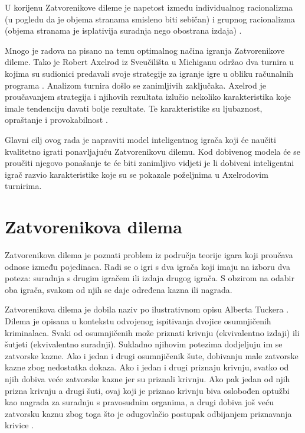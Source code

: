 \documentclass[zavrsnirad]{fer}
\begin{document}
	U korijenu Zatvorenikove dileme je napetost između individualnog racionalizma (u pogledu da je objema stranama smisleno biti sebičan) i grupnog racionalizma (objema stranama je isplativija suradnja nego obostrana izdaja) \cite{1980Axelrod1}.
	
	Mnogo je radova na pisano na temu optimalnog načina igranja Zatvorenikove dileme. Tako je Robert Axelrod iz Sveučilišta u Michiganu održao dva turnira u kojima su sudionici predavali svoje strategije za igranje igre u obliku računalnih programa \cite{1980Axelrod1} \cite{1980Axelrod2}. Analizom turnira došlo se zanimljivih zaključaka. Axelrod je proučavanjem strategija i njihovih rezultata izlučio nekoliko karakteristika koje imale tendenciju davati bolje rezultate. Te karakteristike su ljubaznost, opraštanje i provokabilnost \cite{1980Axelrod2}.
	
	Glavni cilj ovog rada je napraviti model inteligentnog igrača koji će naučiti kvalitetno igrati ponavljajuću Zatvorenikovu dilemu. Kod dobivenog modela će se proučiti njegovo ponašanje te će biti zanimljivo vidjeti je li dobiveni inteligentni igrač razvio karakteristike koje su se pokazale poželjnima u Axelrodovim turnirima.
	

\chapter{Zatvorenikova dilema}
\label{pog:ZatvorenikovaDilema}

	Zatvorenikova dilema je poznati problem iz područja teorije igara koji proučava odnose između pojedinaca. Radi se o igri s dva igrača koji imaju na izboru dva poteza: suradnja s drugim igračem ili izdaja drugog igrača. S obzirom na odabir oba igrača, svakom od njih se daje određena kazna ili nagrada. 
	
	Zatvorenikova dilema je dobila naziv po ilustrativnom opisu Alberta Tuckera \cite{TeorijaIgaraIPravo}. Dilema je opisana u kontekstu odvojenog ispitivanja dvojice osumnjičenih kriminalaca. Svaki od osumnjičenih može priznati krivnju (ekvivalentno izdaji) ili šutjeti (ekvivalentno suradnji). Sukladno njihovim potezima dodjeljuju im se zatvorske kazne. Ako i jedan i drugi osumnjičenik šute, dobivanju male zatvorske kazne zbog nedostatka dokaza. Ako i jedan i drugi priznaju krivnju, svatko od njih dobiva veće zatvorske kazne jer su priznali krivnju. Ako pak jedan od njih prizna krivnju a drugi šuti, ovaj koji je priznao krivnju biva oslobođen optužbi kao nagrada za suradnju s pravosudnim organima, a drugi dobiva još veću zatvorsku kaznu zbog toga što je odugovlačio postupak odbijanjem priznavanja krivice \cite{TeorijaIgaraIPravo}.
	
\end{document}
